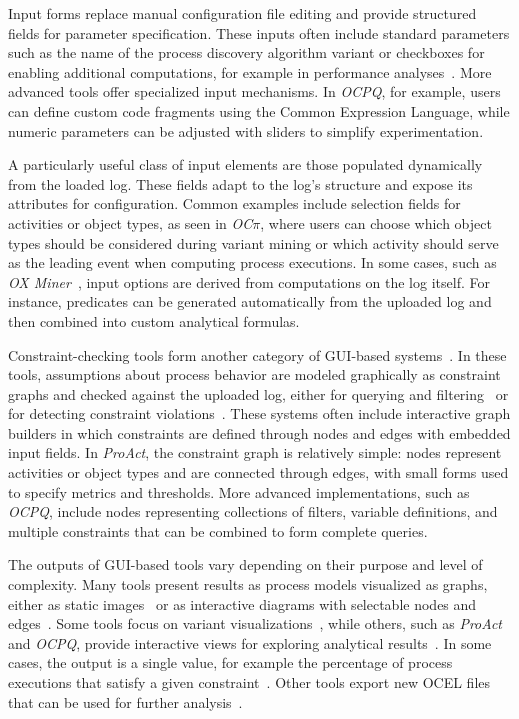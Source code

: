 Input forms replace manual configuration file editing and provide structured fields for parameter specification. These inputs often include standard parameters such as the name of the process discovery algorithm variant or checkboxes for enabling additional computations, for example in performance analyses~\cite{opera}. More advanced tools offer specialized input mechanisms. In \textit{OCPQ}, for example, users can define custom code fragments using the Common Expression Language, while numeric parameters can be adjusted with sliders to simplify experimentation.

A particularly useful class of input elements are those populated dynamically from the loaded log. These fields adapt to the log’s structure and expose its attributes for configuration. Common examples include selection fields for activities or object types, as seen in \textit{OC$\pi$}, where users can choose which object types should be considered during variant mining or which activity should serve as the leading event when computing process executions. In some cases, such as \textit{OX Miner}~\cite{oxminer}, input options are derived from computations on the log itself. For instance, predicates can be generated automatically from the uploaded log and then combined into custom analytical formulas.

Constraint-checking tools form another category of GUI-based systems~\cite{ocpq, proact, constraintchecking}. In these tools, assumptions about process behavior are modeled graphically as constraint graphs and checked against the uploaded log, either for querying and filtering~\cite{ocpq} or for detecting constraint violations~\cite{proact}. These systems often include interactive graph builders in which constraints are defined through nodes and edges with embedded input fields. In \textit{ProAct}, the constraint graph is relatively simple: nodes represent activities or object types and are connected through edges, with small forms used to specify metrics and thresholds. More advanced implementations, such as \textit{OCPQ}, include nodes representing collections of filters, variable definitions, and multiple constraints that can be combined to form complete queries.

The outputs of GUI-based tools vary depending on their purpose and level of complexity. Many tools present results as process models visualized as graphs, either as static images~\cite{ocpi} or as interactive diagrams with selectable nodes and edges~\cite{opera}. Some tools focus on variant visualizations~\cite{ocpi}, while others, such as \textit{ProAct} and \textit{OCPQ}, provide interactive views for exploring analytical results~\cite{proact, ocpq}. In some cases, the output is a single value, for example the percentage of process executions that satisfy a given constraint~\cite{ocpq}. Other tools export new OCEL files that can be used for further analysis~\cite{ocpq}.



